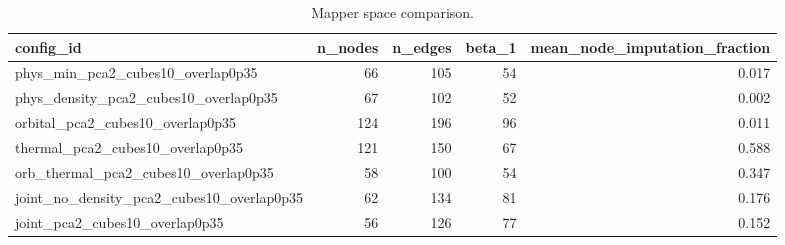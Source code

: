 \begin{table}[p]
\centering
\caption{Mapper space comparison.}
\label{tab:mapper_space_comparison}
\begin{adjustbox}{max width=\linewidth}
\begin{tabular}{lrrrr}
\toprule
config\_id & n\_nodes & n\_edges & beta\_1 & mean\_node\_imputation\_fraction \\
\midrule
phys\_min\_pca2\_cubes10\_overlap0p35 & 66 & 105 & 54 & 0.017 \\
phys\_density\_pca2\_cubes10\_overlap0p35 & 67 & 102 & 52 & 0.002 \\
orbital\_pca2\_cubes10\_overlap0p35 & 124 & 196 & 96 & 0.011 \\
thermal\_pca2\_cubes10\_overlap0p35 & 121 & 150 & 67 & 0.588 \\
orb\_thermal\_pca2\_cubes10\_overlap0p35 & 58 & 100 & 54 & 0.347 \\
joint\_no\_density\_pca2\_cubes10\_overlap0p35 & 62 & 134 & 81 & 0.176 \\
joint\_pca2\_cubes10\_overlap0p35 & 56 & 126 & 77 & 0.152 \\
\bottomrule
\end{tabular}
\end{adjustbox}
\end{table}
